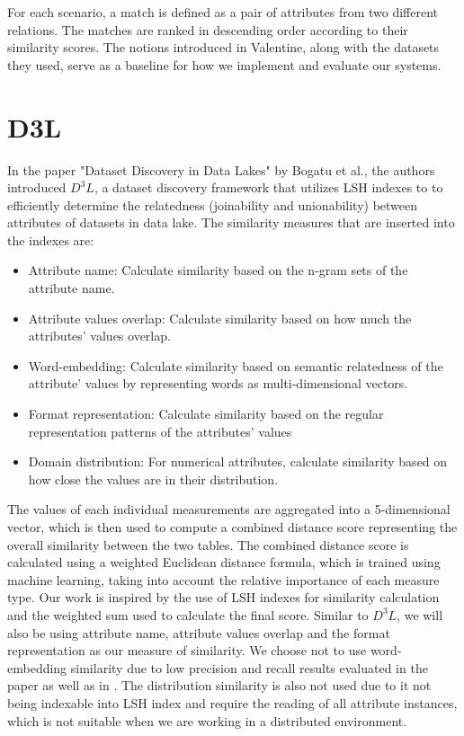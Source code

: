 For each scenario, a match is defined as a pair of attributes from two different relations. The matches are ranked in descending order according to their similarity scores. The notions introduced in Valentine, along with the datasets they used, serve as a baseline for how we implement and evaluate our systems.

\section{D3L}

In the paper "Dataset Discovery in Data Lakes" by Bogatu et al., the authors introduced  \(D^3L\), a dataset discovery framework that utilizes LSH indexes to to efficiently determine the relatedness (joinability and unionability) between attributes of datasets in data lake. The similarity measures that are inserted into the indexes are:

\begin{itemize}
    \item Attribute name: Calculate similarity based on the n-gram sets of the attribute name.
    \item Attribute values overlap: Calculate similarity based on how much the attributes' values overlap.
    \item Word-embedding: Calculate similarity based on semantic relatedness of the attribute' values by representing words as multi-dimensional vectors.
    \item Format representation: Calculate similarity based on the regular representation patterns of the attributes' values
    \item Domain distribution: For numerical attributes, calculate similarity based on how close the values are in their distribution.
\end{itemize}

The values of each individual measurements are aggregated into a 5-dimensional vector, which is then used to compute a combined distance score representing the overall similarity between the two tables. The combined distance score is calculated using a weighted Euclidean distance formula, which is trained using machine learning, taking into account the relative importance of each measure type. Our work is inspired by the use of LSH indexes for similarity calculation and the weighted sum used to calculate the final score. Similar to \(D^3L\), we will also be using attribute name, attribute values overlap and the format representation as our measure of similarity. We choose not to use word-embedding similarity due to low precision and recall results evaluated in the paper as well as in \cite{valentine}. The distribution similarity is also not used due to it not being indexable into LSH index and require the reading of all attribute instances, which is not suitable when we are working in a distributed environment. 

